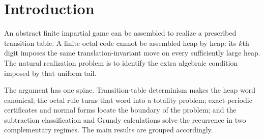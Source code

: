 \documentclass[11pt]{article}
\theoremstyle{definition}
\theoremstyle{remark}
\begin{document}
\section{Introduction}

An abstract finite impartial game can be assembled to realize a prescribed
transition table.  A finite octal code cannot be assembled heap by heap: its
$k$th digit imposes the same translation-invariant move on every sufficiently
large heap.  The natural realization problem is to identify the extra
algebraic condition imposed by that uniform tail.

The argument has one spine.  Transition-table determinism makes the heap word
canonical; the octal rule turns that word into a totality problem; exact
periodic certificates and normal forms locate the boundary of the problem;
and the subtraction classification and Grundy calculations solve the
recurrence in two complementary regimes.  The main results are grouped accordingly.
\end{document}
